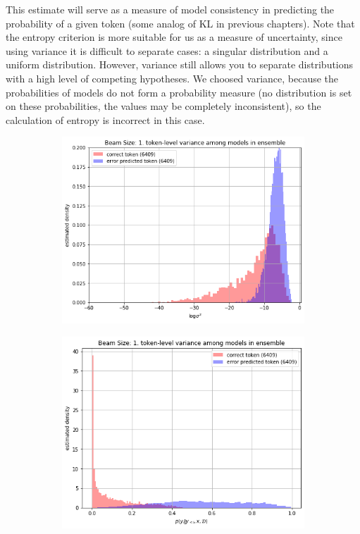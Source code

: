 \documentclass[a4paper,14pt]{extarticle}
\begin{document}
	This estimate will serve as a measure of model consistency in predicting the probability of a given token (some analog of KL in previous chapters). Note that the entropy criterion is more suitable for us as a measure of uncertainty, since using variance it is difficult to separate cases: a singular distribution and a uniform distribution. However, variance still allows you to separate distributions with a high level of competing hypotheses. We choosed variance, because the probabilities of models do not form a probability measure (no distribution is set on these probabilities, the values may be completely inconsistent), so the calculation of entropy is incorrect in this case.
	
	\begin{figure}[t]
		\begin{subfigure}{.5\textwidth}
			\includegraphics[width=\textwidth]{images/inens_var_density.png}
		\end{subfigure}
		\begin{subfigure}{.5\textwidth}
			\includegraphics[width=\textwidth]{images/inens_mean_density.png}
		\end{subfigure}
	\end{figure}
\end{document}
